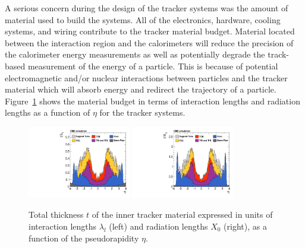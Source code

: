 A serious concern during the design of the tracker systems was the amount of
material used to build the systems. All of the electronics, hardware, 
cooling systems, and wiring contribute to the tracker material budget. Material
located between the interaction region and the calorimeters will reduce the precision 
of the calorimeter energy measurements as well as potentially degrade the track-based
measurement of the energy of a particle. This is because of potential electromagnetic
and/or nuclear interactions between particles and the tracker material which will
absorb energy and redirect the trajectory of a particle. Figure~\ref{fig:cms_tracker_thickness}
shows the material budget in terms of interaction lengths and radiation lengths as a function
of $\eta$ for the tracker systems.

\begin{figure}[htbp]
\centering
     \includegraphics[width=0.4\textwidth]{cms_and_lhc/plots/cms_tracker_thickness_radiationL.pdf}
     \includegraphics[width=0.4\textwidth]{cms_and_lhc/plots/cms_tracker_thickness_interactionL.pdf}
     \caption{
Total thickness $t$ of the inner tracker material expressed in units of interaction lengths 
$\lambda_{l}$ (left) and radiation lengths $X_{0}$ (right), as a function of the pseudorapidity $\eta$.
     }
     \label{fig:cms_tracker_thickness}
\end{figure}



